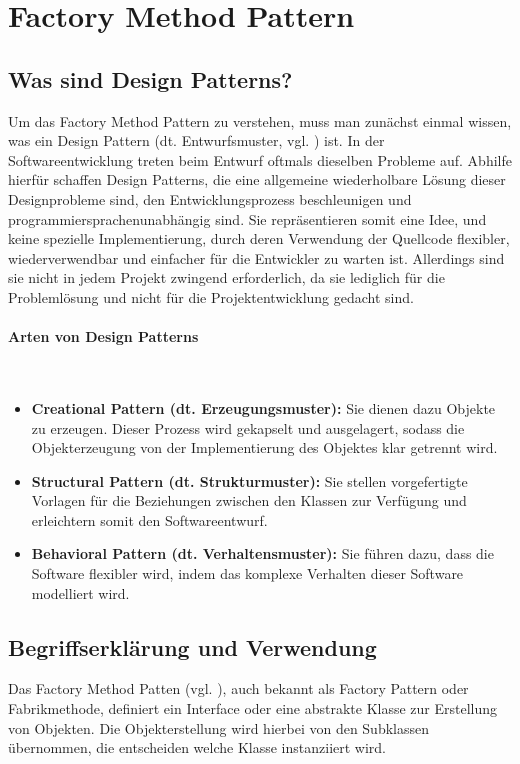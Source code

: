 \section{Factory Method Pattern}
\subsection{Was sind Design Patterns?}
Um das Factory Method Pattern zu verstehen, muss man zunächst einmal wissen, was ein Design Pattern (dt. Entwurfsmuster, vgl. \cite{design_pattern_2020}) ist. In der Softwareentwicklung treten beim Entwurf oftmals dieselben Probleme auf. Abhilfe hierfür schaffen Design Patterns, die eine allgemeine wiederholbare Lösung dieser Designprobleme sind, den Entwicklungsprozess beschleunigen und programmiersprachenunabhängig sind. Sie repräsentieren somit eine Idee, und keine spezielle Implementierung, durch deren Verwendung der Quellcode flexibler, wiederverwendbar und einfacher für die Entwickler zu warten ist. Allerdings sind sie nicht in jedem Projekt zwingend erforderlich, da sie lediglich für die Problemlösung und nicht für die Projektentwicklung gedacht sind.

\paragraph{Arten von Design Patterns}\mbox{}\\

\begin{itemize}
	\item \textbf{Creational Pattern (dt. Erzeugungsmuster):} Sie dienen dazu Objekte zu erzeugen. Dieser Prozess wird gekapselt und ausgelagert, sodass die Objekterzeugung von der Implementierung des Objektes klar getrennt wird.
	\item \textbf{Structural Pattern (dt. Strukturmuster):} Sie stellen vorgefertigte Vorlagen für die Beziehungen zwischen den Klassen zur Verfügung und erleichtern somit den Softwareentwurf.
	\item \textbf{Behavioral Pattern (dt. Verhaltensmuster):} Sie führen dazu, dass die Software flexibler wird, indem das komplexe Verhalten dieser Software modelliert wird.
\end{itemize}

\subsection{Begriffserklärung und Verwendung}
Das Factory Method Patten (vgl. \cite{factory_method_2020}), auch bekannt als Factory Pattern oder Fabrikmethode, definiert ein Interface oder eine abstrakte Klasse zur Erstellung von Objekten. Die Objekterstellung wird hierbei von den Subklassen übernommen, die entscheiden welche Klasse instanziiert wird.

